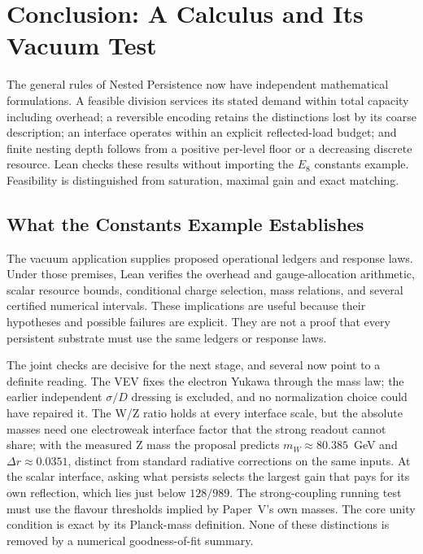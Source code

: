 \section{Conclusion: A Calculus and Its Vacuum Test}

The general rules of Nested Persistence now have independent mathematical formulations. A feasible division services its stated demand within total capacity including overhead; a reversible encoding retains the distinctions lost by its coarse description; an interface operates within an explicit reflected-load budget; and finite nesting depth follows from a positive per-level floor or a decreasing discrete resource. Lean checks these results without importing the $E_8$ constants example. Feasibility is distinguished from saturation, maximal gain and exact matching.

\subsection{What the Constants Example Establishes}
The vacuum application supplies proposed operational ledgers and response laws. Under those premises, Lean verifies the overhead and gauge-allocation arithmetic, scalar resource bounds, conditional charge selection, mass relations, and several certified numerical intervals. These implications are useful because their hypotheses and possible failures are explicit. They are not a proof that every persistent substrate must use the same ledgers or response laws.

The joint checks are decisive for the next stage, and several now point to a definite reading. The VEV fixes the electron Yukawa through the mass law; the earlier independent $\sigma/D$ dressing is excluded, and no normalization choice could have repaired it. The W/Z ratio holds at every interface scale, but the absolute masses need one electroweak interface factor that the strong readout cannot share; with the measured Z mass the proposal predicts $m_W\approx80.385$~GeV and $\Delta r\approx0.0351$, distinct from standard radiative corrections on the same inputs. At the scalar interface, asking what persists selects the largest gain that pays for its own reflection, which lies just below $128/989$. The strong-coupling running test must use the flavour thresholds implied by Paper~V's own masses. The core unity condition is exact by its Planck-mass definition. None of these distinctions is removed by a numerical goodness-of-fit summary.


